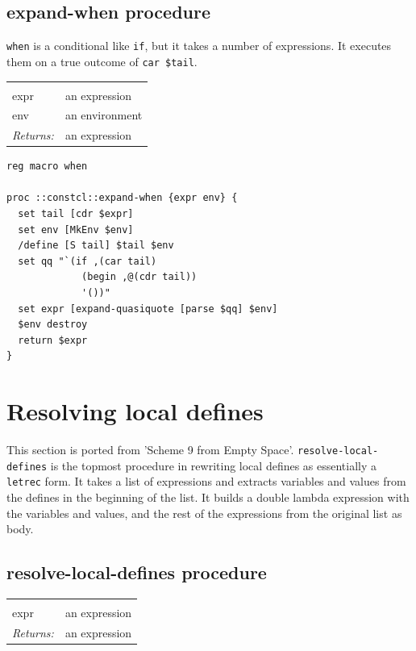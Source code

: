 \documentclass[twoside]{report}
\begin{document}
\subsection{expand-when procedure}
\label{expandwhen-procedure}

\texttt{when} is a conditional like \texttt{if}, but it takes a number of expressions. It executes them on a true outcome of \texttt{car \$tail}.

\noindent\begin{tabular}{ |p{1.9cm} p{8cm}| }
\hline
\rowcolor[HTML]{CCCCCC} \multicolumn{2}{|l|}{\bf expand-when (internal)} \\
expr & an expression \\
env & an environment \\
\textit{Returns:} & an expression \\
\hline
\end{tabular}

\begin{lstlisting}
reg macro when

proc ::constcl::expand-when {expr env} {
  set tail [cdr $expr]
  set env [MkEnv $env]
  /define [S tail] $tail $env
  set qq "`(if ,(car tail)
             (begin ,@(cdr tail))
             '())"
  set expr [expand-quasiquote [parse $qq] $env]
  $env destroy
  return $expr
}
\end{lstlisting}

\section{Resolving local defines}
\label{resolving-local-defines}

This section is ported from 'Scheme 9 from Empty Space'. \texttt{resolve-local-defines} is the topmost procedure in rewriting local defines as essentially a \texttt{letrec} form. It takes a list of expressions and extracts variables and values from the defines in the beginning of the list. It builds a double lambda expression with the variables and values, and the rest of the expressions from the original list as body.

\subsection{resolve-local-defines procedure}
\label{resolvelocaldefines-procedure}

\noindent\begin{tabular}{ |p{1.9cm} p{8cm}| }
\hline
\rowcolor[HTML]{CCCCCC} \multicolumn{2}{|l|}{\bf resolve-local-defines} \\
expr & an expression \\
\textit{Returns:} & an expression \\
\hline
\end{tabular}
\end{document}
